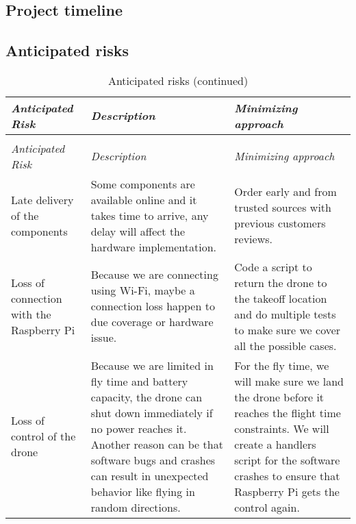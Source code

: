 \documentclass[../main.tex]{subfiles}
\begin{document}
\subsection{Project timeline}



\subsection{Anticipated risks}

\begin{center}
    \begin{xltabular}{\textwidth}{ X X X }
        \caption{Anticipated risks.}
        \label{tab:risks} \\
        \toprule
        \textit{Anticipated Risk} 
        & \textit{Description} 
        & \textit{Minimizing approach} \\
        \midrule
        \endfirsthead

        \caption[]{Anticipated risks (continued)} \\
        \toprule
        \textit{Anticipated Risk} 
        & \textit{Description} 
        & \textit{Minimizing approach} \\
        \midrule
        \endhead

        Late delivery of the components 
        & Some components are available online 
        and it takes time to arrive, 
        any delay will affect the hardware implementation.
        & Order early and from trusted sources with previous 
        customers reviews. \\
        
        Loss of connection with the Raspberry Pi
        & Because we are connecting using Wi-Fi, 
        maybe a connection loss 
        happen to due coverage or hardware issue.
        & Code a script to return the drone 
        to the takeoff location 
        and do multiple tests to make sure 
        we cover all the possible cases. \\
        
        Loss of control of the drone
        & Because we are limited in fly time 
        and battery capacity, 
        the drone can shut down immediately if 
        no power reaches it.
        Another reason can be that software bugs 
        and crashes can 
        result in unexpected behavior like flying 
        in random directions.
        & For the fly time, we will make sure 
        we land the drone before it reaches 
        the flight time constraints.
        We will create a handlers script 
        for the software crashes 
        to ensure that Raspberry Pi gets the 
        control again.  \\
        

\end{xltabular}
\end{center}
\end{document}
